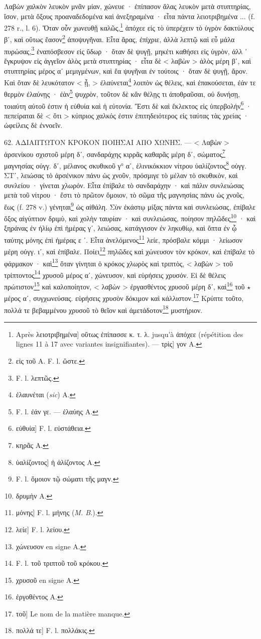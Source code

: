 \documentclass[a4paper, 11pt, oneside, polutonikogreek, french]{article}
\begin{document}
Λαβὼν χαλκὸν λευκὸν μνᾶν μίαν, χώνευε · ἐπίπασον ἅλας λευκὸν μετὰ στυπτηρίας, ἴσον, μετὰ ὄξους προαναδεδομένα καὶ ἀνεξηραμένα · εἶτα πάντα λειοτριβημένα ... (f. 278 r., l. 6). Ὅταν οὖν χωνευθῇ καλῶς,\footnote{Après λειοτριβημένα] οὕτως ἐπίπασσε κ. τ. λ. jusqu'à ἀπόχεε (répétition des lignes 11 à 17 avec variantes insignifiantes). --- τρὶς] γον A.} ἀπόχεε εἰς τὸ ὑπερέχειν τὸ ὑγρὸν δακτύλους βʹ, καὶ οὕτως ἔασον\footnote{εἰς τοῦ A. F. l. ὥστε.} ἀποψυγῆναι. Εἶτα ἄρας, ἐπίχριε, ἀλλὰ λεπτῷ καὶ εὖ μάλα πυρώσας,\footnote{F. l. λεπτῶς.} ἐναπόσβεσον εἰς ὕδωρ · ὅταν δὲ ψυγῇ, μηκέτι καθήσει εἰς ὑγρὸν, ἀλλ ᾽ ἔγκρυψον εἰς ἀγγεῖον ἀλὸς μετὰ στυπτηρίας · εἶτα δὲ < λαβὼν > ἀλὸς μέρη βʹ, καὶ στυπτηρίας μέρος αʹ μεμιγμένων, καὶ ἔα ψυγῆναι ἐν τούτοις · ὅταν δὲ ψυγῇ, ἄρον. Καὶ ὅταν δὲ λευκότατον < ᾖ, > ἐλαύνεται\footnote{ἐλαυνέται (\emph{sic}) A.} λοιπὸν ὡς θέλεις, καὶ ἐπακούσεται, ἐάν τε θερμὸν ἐλαύνῃς · ἐὰν\footnote{F. l. ἐάν γε. --- ἐλαύης A.} ψυχρὸν, τοῦτον δὲ κἂν θέλῃς τι ἀποθραῦσαι, οὐ δυνήσῃ, τοιαύτη αὐτοῦ ἐστιν ἡ εὐθυία καὶ ἡ εὐτονία. Ἔστι δὲ καὶ ἔκλεκτος εἰς ὑπερβολήν\footnote{εὐθυία] F. l. εὐστάθεια.} · πεπείραται δὲ < ὅτι > κύπριος χαλκός ἐστιν ἐπιτηδειότερος εἰς ταύτας τὰς χρείας · ὠφείλεις δὲ ἐννοεῖν.

62. ΑΔΙΑΠΤΩΤΟΝ ΚΡΟΚΟΝ ΠΟΙΗΣΑΙ ΑΠΟ ΧΩΝΗΣ. --- < Λαβὼν > ἀρσενίκου σχιστοῦ μέρη δʹ, σανδαράχης κιρρᾶς καθαρᾶς μέρη δʹ, σώματος\footnote{κηρᾶς A.} μαγνησίας οὐγγ. δʹ, μέλανος σκυθικοῦ γ° αʹ, ἑλινικόκκιον νίτρου ὑαλίζοντος\footnote{ὑαλίζοντος] ἡ ἁλίζοντος A.} οὐγγ. ΣΤʹ, λειώσας τὸ ἀρσένικον πάνυ ὡς χνοῦν, πρόσμιγε τὸ μέλαν τὸ σκυθικὸν, καὶ συνλείου · γίνεται χλωρόν. Εἶτα ἐπίβαλε τὸ σανδαράχην · καὶ πάλιν συνλειώσας μετὰ τοῦ νίτρου · ἔστι τὸ πρῶτον ὅμοιον, τὸ σῶμα τῆς μαγνησίας πάνυ ὡς χνοῦς, ἕως (f. 278 v.) γένηται\footnote{F. l. ὅμοιον τῷ σώματι τῆς μαγν.} ὡς αἰθάλη. Σὺν ἐκάστῳ μίξας πάντα καὶ συνλειώσας, ἐπίβαλε ὄξος αἰγύπτιον δριμὺ, καὶ χολὴν ταυρίαν · καὶ συνλειώσας, ποίησον πηλῶδες\footnote{δρυμὴν A.} · καὶ ξηράνας ἐν ἡλίῳ ἐπὶ ἡμέρας γʹ, λειώσας, κατάγγισον ἐν ληκυθίῳ, καὶ ὄπτα ἐν ᾧ ταύτης μόνης ἐπὶ ἡμέρας ε ᾽. Εἶτα ἀνελόμενος\footnote{μόνης] F. l. μήνης (\emph{M. B.}).} λείε, πρόσβαλε κόμμι · λείωσον μέρη οὐγγ. ιʹ, καὶ ἐπίβαλε. Ποίει\footnote{λείε] F. l. λείου.} πηλῶδες καὶ χώνευσον τὸν κρόκον, καὶ ἐπίβαλε τὸ φάρμακον · καὶ\footnote{χώνευσον en signe A.} ὅταν γίνηται ὁ κρόκος χλωρὸς καὶ τριπτὸς, < λαβὼν > τοῦ τρίπτοντος\footnote{F. l. τοῦ τριπτοῦ τοῦ κρόκου.} χρυσοῦ μέρος αʹ, χώνευσον, καὶ εὑρήσεις χρυσόν. Εἰ δὲ θέλεις πρώτιστον\footnote{χρυσοῦ en signe A.} καὶ καλοποίητον, < λαβὼν > ἐργασθέντος χρυσοῦ μέρη δʹ, καὶ\footnote{ἐργοθέντος A.} τοῦ $\star$ μέρος αʹ, συγχωνεύσας. εὑρήσεις χρυσὸν δόκιμον καὶ κάλλιστον.\footnote{τοῦ] Le nom de la matière manque.} Κρύπτε τοῦτο, πολλά τε βεβαμμένου χρυσοῦ τὸ θεῖον καὶ ἀμετάδοτον\footnote{πολλά τε] F. l. πολλάκις.} μυστήριον.
\end{document}
